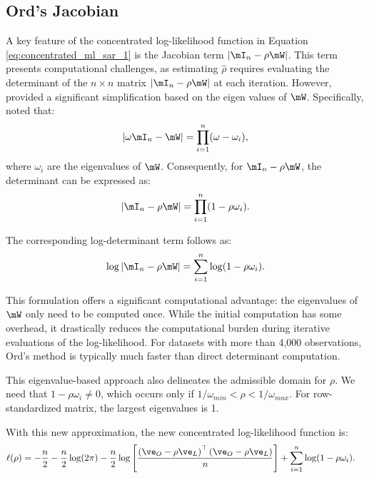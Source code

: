 \documentclass[english,12pt]{book}\usepackage[]{graphicx}\usepackage[]{xcolor}
\begin{document}
\subsection{Ord's Jacobian}

A key feature of the concentrated log-likelihood function in Equation \eqref{eq:concentrated_ml_sar_1} is the Jacobian term $\left|\mI_n - \rho\mW\right|$. This term presents computational challenges, 
as estimating $\widehat{\rho}$ requires evaluating the determinant of the $n\times n$ matrix $\left|\mI_n - \rho\mW\right|$ at each iteration. However, \cite{ord1975estimation} provided a significant simplification based on the eigen values of $\mW$. Specifically, \cite{ord1975estimation} noted that:
\begin{equation*}
	\left|\omega\mI_n -\mW\right|=\prod_{i=1}^n(\omega-\omega_i),
\end{equation*}	
%
where $\omega_i$ are the eigenvalues of $\mW$. Consequently, for $\mI_n - \rho\mW$, the determinant can be expressed as:
\begin{equation*}
\left|\mI_n -\rho\mW\right|=\prod_{i=1}^n(1-\rho\omega_i).
\end{equation*}	

The corresponding log-determinant term follows as:
\begin{equation}\label{eq:Ord-determinant}
\log\left|\mI_n -\rho\mW\right|=\sum_{i=1}^n\log(1 - \rho\omega_i).
\end{equation}

This formulation offers a significant computational advantage: the eigenvalues of $\mW$ only need to be computed once. While the initial computation has some overhead, it drastically reduces the computational burden during iterative evaluations of the log-likelihood. For datasets with more than 4,000 observations, Ord's method is typically much faster than direct determinant computation.


This eigenvalue-based approach also delineates the admissible domain for $\rho$. We need that $1 - \rho \omega_i \neq 0$, which occurs only if $1/\omega_{min} < \rho < 1/\omega_{max}$. For row-standardized matrix, the largest eigenvalues is 1. 

With this new approximation, the new concentrated log-likelihood function is:
\begin{equation}\label{eq:concentrated_ml_sar_2}
  \begin{aligned}
\ell(\rho)& =-\frac{n}{2}-\frac{n}{2}\log(2\pi) - \frac{n}{2}\log\left[\frac{\left(\ve_O - \rho\ve_L\right)^\top\left(\ve_O - \rho\ve_L\right)}{n}\right] + \sum_{i=1}^n\log(1 - \rho\omega_i).
  \end{aligned}
\end{equation}	
\end{document}

